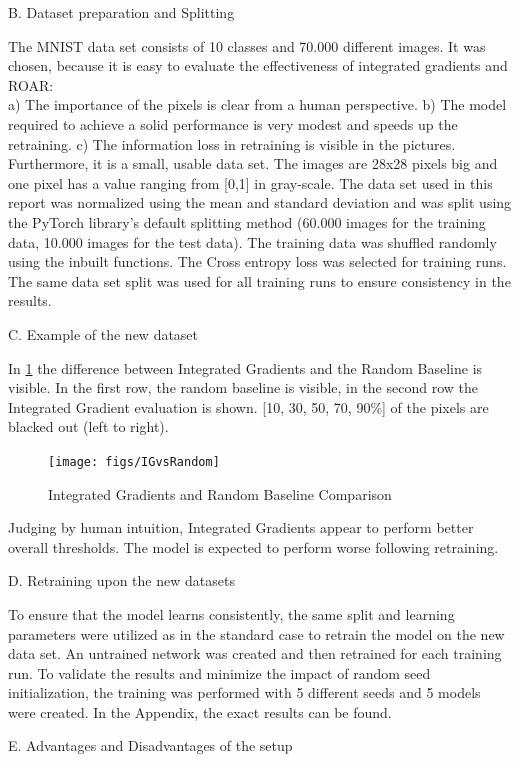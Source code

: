 B. Dataset preparation and Splitting

The MNIST data set consists of 10 classes and 70.000 different images. It was chosen, because it is easy to evaluate the effectiveness of integrated gradients and ROAR:\\ a) The importance of the pixels is clear from a human perspective. b) The model required to achieve a solid performance is very modest and speeds up the retraining. c) The information loss in retraining is visible in the pictures. Furthermore, it is a small, usable data set. The images are 28x28 pixels big and one pixel has a value ranging from [0,1] in gray-scale. The data set used in this report was normalized using the mean and standard deviation and was split using the PyTorch library’s default splitting method (60.000 images for the training data, 10.000 images for the test data). The training data was shuffled randomly using the inbuilt functions. The Cross entropy loss was selected for training runs. The same data set split was used for all training runs to ensure consistency in the results.

C. Example of the new dataset

In \ref{fig:IGvsRandom} the difference between Integrated Gradients and the Random Baseline is visible. In the first row, the random baseline is visible, in the second row the Integrated Gradient evaluation is shown. [10, 30, 50, 70, 90\%] of the pixels are blacked out (left to right).

\begin{figure}[h!]
	\centering
	\texttt{[image: figs/IGvsRandom]}
	\caption{Integrated Gradients and Random Baseline Comparison}
	\label{fig:IGvsRandom}
\end{figure}

Judging by human intuition, Integrated Gradients appear to perform better overall thresholds. The model is expected to perform worse following retraining.

D. Retraining upon the new datasets

To ensure that the model learns consistently, the same split and learning parameters were utilized as in the standard case to retrain the model on the new data set. An untrained network was created and then retrained for each training run. To validate the results and minimize the impact of random seed initialization, the training was performed with 5 different seeds and 5 models were created. In the Appendix, the exact results can be found.

E. Advantages and Disadvantages of the setup


